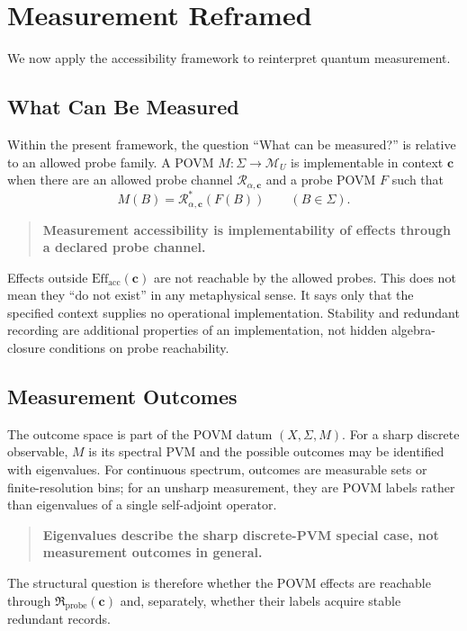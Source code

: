 \documentclass[12pt,a4paper,openany]{book}
\begin{document}
\section{Measurement Reframed}
\label{E-sec:measurement}

We now apply the accessibility framework to reinterpret quantum measurement.

\subsection{What Can Be Measured}

Within the present framework, the question ``What can be measured?'' is relative to an allowed probe family.  A POVM $M:\Sigma\to\mathcal M_U$ is implementable in context $\mathbf c$ when there are an allowed probe channel $\mathcal R_{\alpha,\mathbf c}$ and a probe POVM $F$ such that
\[
M(B)=\mathcal R_{\alpha,\mathbf c}^{*}(F(B))
\qquad(B\in\Sigma).
\]

\begin{quote}
\textbf{Measurement accessibility is implementability of effects through a declared probe channel.}
\end{quote}

Effects outside $\mathrm{Eff}_{\mathrm{acc}}(\mathbf c)$ are not reachable by the allowed probes.  This does not mean they ``do not exist'' in any metaphysical sense.  It says only that the specified context supplies no operational implementation.  Stability and redundant recording are additional properties of an implementation, not hidden algebra-closure conditions on probe reachability.

\subsection{Measurement Outcomes}

The outcome space is part of the POVM datum $(X,\Sigma,M)$.  For a sharp discrete observable, $M$ is its spectral PVM and the possible outcomes may be identified with eigenvalues.  For continuous spectrum, outcomes are measurable sets or finite-resolution bins; for an unsharp measurement, they are POVM labels rather than eigenvalues of a single self-adjoint operator.

\begin{quote}
\textbf{Eigenvalues describe the sharp discrete-PVM special case, not measurement outcomes in general.}
\end{quote}

The structural question is therefore whether the POVM effects are reachable through $\mathfrak R_{\mathrm{probe}}(\mathbf c)$ and, separately, whether their labels acquire stable redundant records.
\end{document}

